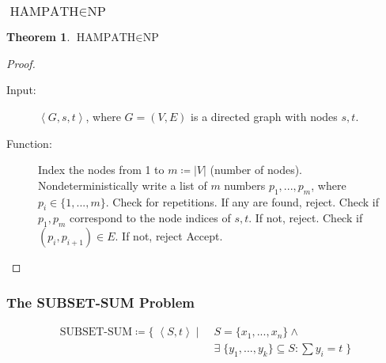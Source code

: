 \documentclass[notheorems]{beamer}
\theoremstyle{definition}
\newtheorem{theorem}{Theorem}
\theoremstyle{remark}
\newcommand{\npclass}{\text{NP}}
\newcommand{\hampathprob}{\text{HAMPATH}}
\newcommand{\subsetsumprob}{\text{SUBSET-SUM}}
\newcommand{\lpp}{\left \langle}
\newcommand{\rpp}{\right \rangle}
\newcommand{\enc}[1]{\lpp #1 \rpp}
\begin{document}
\begin{frame}
    \frametitle{\(\hampathprob \in \npclass\)}
    \begin{theorem}
        \(\hampathprob \in \npclass\)
    \end{theorem}

    \pause

    \begin{proof}
        \scriptsize
        \begin{description}
            \item[Input:] \(\enc{G, s, t}\), where \(G = (V, E)\) is a directed graph with nodes \(s, t\).
            \item[Function:] \phantom{}
                  \begin{algorithmic}[1]
                      \State Index the nodes from 1 to \(m \coloneqq |V|\) (number of nodes). Nondeterministically write a list of \(m\) numbers \(p_1, ..., p_m\), where \(p_i \in \{1, ..., m\}\).
                      \State Check for repetitions. If any are found, reject.
                      \State Check if \(p_1, p_m\) correspond to the node indices of \(s, t\). If not, reject.
                      \State Check if \((p_i, p_{i+1}) \in E\). If not, reject
                      \EndFor
                      \State Accept.
                  \end{algorithmic}
        \end{description}
    \end{proof}

\end{frame}

\begin{frame}
    \frametitle{The SUBSET-SUM Problem}

    \begin{align*}
        \subsetsumprob \coloneqq \{\; \enc{S, t} \mid \; & S = \{x_1, ..., x_n\} \land \\&\exists \; \{y_1,...,y_k\} \subseteq S\colon \textstyle\sum y_i = t  \;\}
    \end{align*}

\end{frame}
\end{document}
